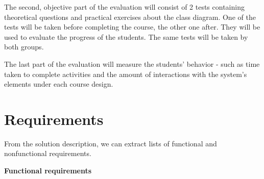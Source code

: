 The second, objective part of the evaluation will consist of 2 tests containing theoretical questions and practical exercises about the class diagram. One of the tests will be taken before completing the course, the other one after. They will be used to evaluate the progress of the students. The same tests will be taken by both groups.

The last part of the evaluation will measure the students' behavior - such as time taken to complete activities and the amount of interactions with the system's elements under each course design.

\section{Requirements}

From the solution description, we can extract lists of functional and nonfunctional requirements.


\textbf{Functional requirements}


